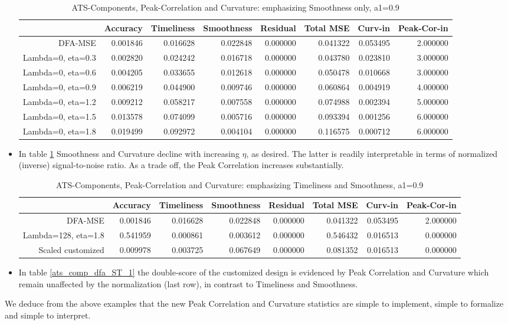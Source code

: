 \documentclass[a4paper]{book}
\begin{document}
\begin{itemize}
\begin{table}[ht]
\centering
\begin{tabular}{rrrrrrrr}
  \hline
 & Accuracy & Timeliness & Smoothness & Residual & Total MSE & Curv-in & Peak-Cor-in \\ 
  \hline
DFA-MSE & 0.001846 & 0.016628 & 0.022848 & 0.000000 & 0.041322 & 0.053495 & 2.000000 \\ 
  Lambda=0, eta=0.3 & 0.002820 & 0.024242 & 0.016718 & 0.000000 & 0.043780 & 0.023810 & 3.000000 \\ 
  Lambda=0, eta=0.6 & 0.004205 & 0.033655 & 0.012618 & 0.000000 & 0.050478 & 0.010668 & 3.000000 \\ 
  Lambda=0, eta=0.9 & 0.006219 & 0.044900 & 0.009746 & 0.000000 & 0.060864 & 0.004919 & 4.000000 \\ 
  Lambda=0, eta=1.2 & 0.009212 & 0.058217 & 0.007558 & 0.000000 & 0.074988 & 0.002394 & 5.000000 \\ 
  Lambda=0, eta=1.5 & 0.013578 & 0.074099 & 0.005716 & 0.000000 & 0.093394 & 0.001256 & 6.000000 \\ 
  Lambda=0, eta=1.8 & 0.019499 & 0.092972 & 0.004104 & 0.000000 & 0.116575 & 0.000712 & 6.000000 \\ 
   \hline
\end{tabular}
\caption{ATS-Components, Peak-Correlation and Curvature: emphasizing Smoothness only, a1=0.9} 
\label{ats_comp_dfa_S_1_pc}
\end{table}\item In table \ref{ats_comp_dfa_S_1_pc} Smoothness and Curvature decline with increasing $\eta$, as desired. The latter is readily interpretable in terms of normalized (inverse) signal-to-noise ratio. As a trade off, the Peak Correlation increases substantially. 
\begin{table}[ht]
\centering
\begin{tabular}{rrrrrrrr}
  \hline
 & Accuracy & Timeliness & Smoothness & Residual & Total MSE & Curv-in & Peak-Cor-in \\ 
  \hline
DFA-MSE & 0.001846 & 0.016628 & 0.022848 & 0.000000 & 0.041322 & 0.053495 & 2.000000 \\ 
  Lambda=128, eta=1.8 & 0.541959 & 0.000861 & 0.003612 & 0.000000 & 0.546432 & 0.016513 & 0.000000 \\ 
  Scaled customized & 0.009978 & 0.003725 & 0.067649 & 0.000000 & 0.081352 & 0.016513 & 0.000000 \\ 
   \hline
\end{tabular}
\caption{ATS-Components, Peak-Correlation and Curvature: emphasizing Timeliness and Smoothness, a1=0.9} 
\label{ats_comp_dfa_ST_1_pc}
\end{table}\item In table \ref{ats_comp_dfa_ST_1} the double-score of the customized design is evidenced by Peak Correlation and Curvature which remain unaffected by the normalization (last row), in contrast to Timeliness and Smoothness.      
\end{itemize}
We deduce from the above examples that the new Peak Correlation and Curvature statistics are simple to implement, simple to formalize and simple to interpret.
\end{document}
